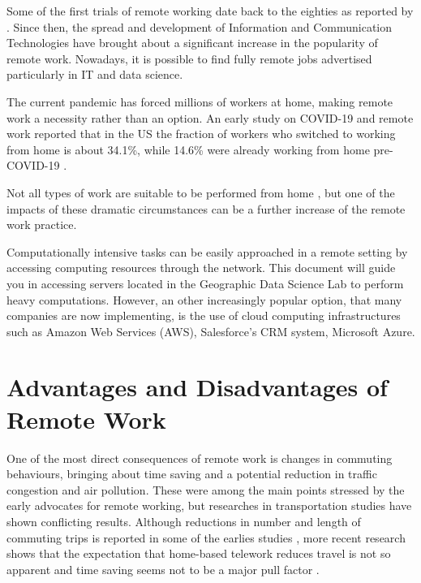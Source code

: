 \documentclass[
]{book}
\begin{document}
Some of the first trials of remote working date back to the eighties as reported by \citet{olson1983remote}. Since then, the spread and development of Information and Communication Technologies have brought about a significant increase in the popularity of remote work. Nowadays, it is possible to find fully remote jobs advertised particularly in IT and data science.

The current pandemic has forced millions of workers at home, making remote work a necessity rather than an option. An early study on COVID-19 and remote work reported that in the US the fraction of workers who switched to working from home is about 34.1\%, while 14.6\% were already working from home pre-COVID-19 \citep{brynjolfsson2020covid}.

Not all types of work are suitable to be performed from home \citep{holgersen2020and},
but one of the impacts of these dramatic circumstances can be a further increase of the remote work practice.

Computationally intensive tasks can be easily approached in a remote setting by accessing computing resources through the network. This document will guide you in accessing servers located in the Geographic Data Science Lab to perform heavy computations. However, an other increasingly popular option, that many companies are now implementing, is the use of cloud computing infrastructures such as Amazon Web Services (AWS), Salesforce's CRM system, Microsoft Azure.

\hypertarget{advantages-and-disadvantages-of-remote-work}{%
\section{Advantages and Disadvantages of Remote Work}\label{advantages-and-disadvantages-of-remote-work}}

One of the most direct consequences of remote work is changes in commuting behaviours, bringing about time saving and a potential reduction in traffic congestion and air pollution. These were among the main points stressed by the early advocates for remote working, but researches in transportation studies have shown conflicting results. Although reductions in number and length of commuting trips is reported in some of the earlies studies \citep{Kitamura1991, olson1983remote}, more recent research shows that the expectation that home-based telework reduces travel is not so apparent \citep{e2018does} and time saving seems not to be a major pull factor \citep{bailey2002review}.
\end{document}

